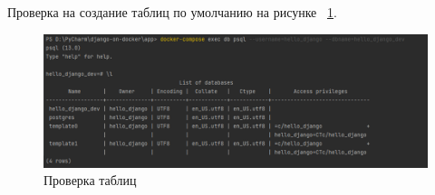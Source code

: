	Проверка на создание таблиц по умолчанию на рисунке ~\ref{picture5}.
\begin{figure}[!ht]
  \centering
  \includegraphics[scale=0.8]{ResearchNotes/rndhpc_not_gui_2022_10_29/picture5.png}
  \caption{Проверка таблиц}
  \label{picture5}
\end{figure}
\noteattributes{}
